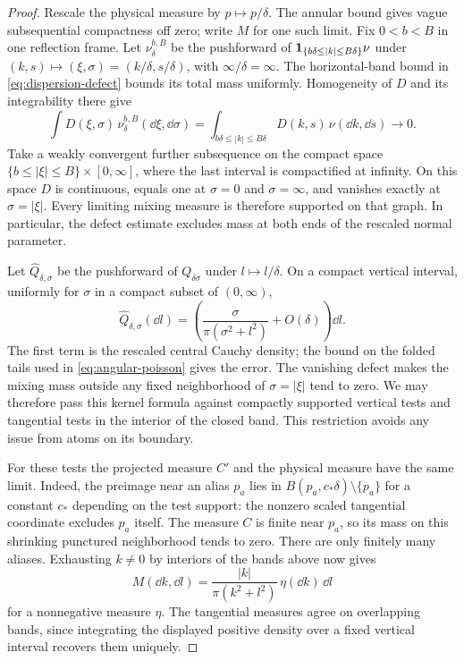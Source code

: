 \begin{proof}
Rescale the physical measure by $p\mapsto p/\delta$. The annular bound gives
vague subsequential compactness off zero; write $M$ for one such limit.
Fix $0<b<B$ in one reflection frame. Let $\nu_\delta^{b,B}$ be the
pushforward of $\mathbf 1_{\{b\delta\le |k|\le B\delta\}}\nu$ under
$(k,s)\mapsto(\xi,\sigma)=(k/\delta,s/\delta)$, with $\infty/\delta=\infty$.
The horizontal-band bound in \cref{eq:dispersion-defect} bounds its total
mass uniformly. Homogeneity of $D$ and its integrability there give
\[
 \int D(\xi,\sigma)\,\nu_\delta^{b,B}(\dd\xi,\dd\sigma)
   =\int_{b\delta\le |k|\le B\delta}D(k,s)\,\nu(\dd k,\dd s)
   \longrightarrow0.
\]
Take a weakly convergent further subsequence on the compact space
$\{b\le|\xi|\le B\}\times[0,\infty]$, where the last interval is
compactified at infinity. On this space $D$ is continuous, equals one
at $\sigma=0$ and $\sigma=\infty$, and vanishes exactly at
$\sigma=|\xi|$. Every limiting mixing measure is therefore supported
on that graph. In particular, the defect estimate excludes mass at
both ends of the rescaled normal parameter.

Let $\widehat Q_{\delta,\sigma}$ be the pushforward of $Q_{\delta\sigma}$
under $l\mapsto l/\delta$. On a compact vertical interval, uniformly for
$\sigma$ in a compact subset of $(0,\infty)$,
\[
 \widehat Q_{\delta,\sigma}(\dd l)
   =\left(\frac{\sigma}{\pi(\sigma^2+l^2)}+O(\delta)\right)\dd l.
\]
The first term is the rescaled central Cauchy density; the bound on the
folded tails used in \cref{eq:angular-poisson} gives the error. The vanishing
defect makes the mixing mass outside any fixed neighborhood of
$\sigma=|\xi|$ tend to zero. We may therefore pass this kernel formula
against compactly supported vertical tests and tangential tests in the
interior of the closed band. This restriction avoids any issue from atoms
on its boundary.

For these tests the projected measure $C'$ and the physical measure have
the same limit. Indeed, the preimage near an alias $p_a$ lies in
$B(p_a,c_*\delta)\setminus\{p_a\}$ for a constant $c_*$ depending on the
test support: the nonzero scaled tangential coordinate excludes $p_a$
itself. The measure $C$ is finite near $p_a$, so its mass on this shrinking
punctured neighborhood tends to zero. There are only finitely many aliases.
Exhausting $k\ne0$ by interiors of the bands above now gives
\[
 M(\dd k,\dd l)=\frac{|k|}{\pi(k^2+l^2)}\,\eta(\dd k)\,\dd l
\]
for a nonnegative measure $\eta$. The tangential measures agree on
overlapping bands, since integrating the displayed positive density over
a fixed vertical interval recovers them uniquely.


\end{proof}
